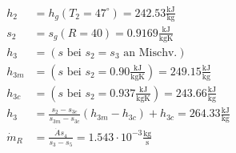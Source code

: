 \begin{align*}
h_2 &= h_g(T_2 = 47^\circ) = 242.53 \frac{\text{kJ}}{\text{kg}} \\
s_2 &= s_g(R = 40) = 0.9169 \frac{\text{kJ}}{\text{kgK}} \\
h_3 &= (s \text{ bei } s_2 = s_3 \text{ an } \text{Mischv.}) \\
h_{3m} &= (s \text{ bei } s_2 = 0.90 \frac{\text{kJ}}{\text{kgK}}) = 249.15 \frac{\text{kJ}}{\text{kg}} \\
h_{3c} &= (s \text{ bei } s_2 = 0.937 \frac{\text{kJ}}{\text{kgK}}) = 243.66 \frac{\text{kJ}}{\text{kg}} \\
h_3 &= \frac{s_2 - s_{3c}}{s_{3m} - s_{3c}} (h_{3m} - h_{3c}) + h_{3c} = 264.33 \frac{\text{kJ}}{\text{kg}} \\
\dot{m}_R &= \frac{\dot{A} s_4}{s_3 - s_5} = 1.543 \cdot 10^{-3} \frac{\text{kg}}{\text{s}}
\end{align*}
